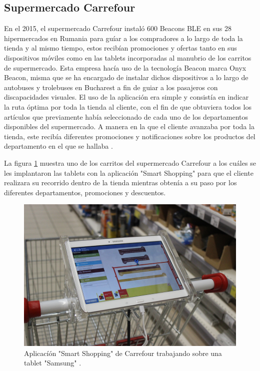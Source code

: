 \subsection{Supermercado Carrefour}
En el 2015, el supermercado Carrefour instaló 600 Beacons BLE  en sus 28 hipermercados en Rumania para guíar a los compradores a lo largo de toda la tienda y al mismo tiempo, estos recibían promociones y ofertas tanto en sus dispositivos móviles como en las tablets incorporadas al manubrio de los carritos de supermercado. Esta empresa hacía uso de la tecnología Beacon marca Onyx Beacon, misma que se ha encargado de instalar dichos dispositivos a lo largo de autobuses y trolebuses en Bucharest a fin de guiar a los pasajeros con discapacidades visuales.
El uso de la aplicación era simple y consistía en indicar la ruta óptima por toda la tienda al cliente, con el fin de que obtuviera todos los artículos que previamente había seleccionado de cada uno de los departamentos disponibles del supermercado. A manera en la que el cliente avanzaba por toda la tienda, este recibía diferentes promociones y notificaciones sobre los productos del departamento en el que se hallaba \cite{NFC}.
\\ \par
La figura \ref{image:smartCarrefour} muestra uno de los carritos del supermercado Carrefour a los cuáles se les implantaron las tablets con la aplicación "Smart Shopping" para que el cliente realizara su recorrido dentro de la tienda mientras obtenía a su paso por los diferentes departamentos, promociones y descuentos.

\FloatBarrier
\begin{figure}[htbp!]
		\centering
			\includegraphics[width=.45 \textwidth]{imagenes/samsung}
		\caption{Aplicacíón "Smart Shopping" de Carrefour trabajando sobre una tablet "Samsung"  \cite{OnyxBeacon}.}
		\label{image:smartCarrefour}
\end{figure}
\FloatBarrier
